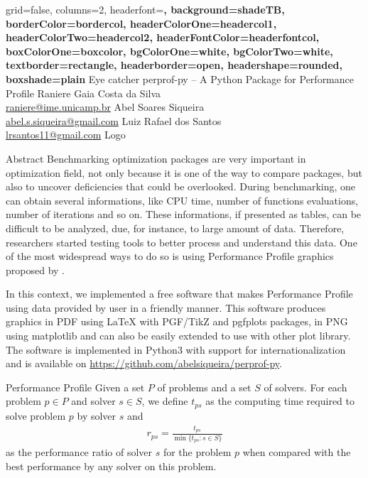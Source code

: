 \documentclass[a0paper,portrait]{baposter}
\begin{document}

\begin{poster}
  {
    grid=false,
    columns=2,
    headerfont=\Large\sf\bf,
    background=shadeTB,
    borderColor=bordercol,
    headerColorOne=headercol1,
    headerColorTwo=headercol2,
    headerFontColor=headerfontcol,
    boxColorOne=boxcolor,
    bgColorOne=white,
    bgColorTwo=white,
    textborder=rectangle,
    headerborder=open,
    headershape=rounded,
    boxshade=plain
  }
  {
    Eye catcher
  }
  {
      perprof-py -- A Python Package for Performance Profile 
  }
  {
        Raniere Gaia Costa da Silva \\
        \url{raniere@ime.unicamp.br}
        Abel Soares Siqueira \\
        \url{abel.s.siqueira@gmail.com}
        Luiz Rafael dos Santos \\
        \url{lrsantos11@gmail.com}
  }
  {
    Logo
  }


  \begin{posterbox}[column=0]{Abstract}
    Benchmarking optimization packages are very important in optimization
    field, not only because it is one of the way to compare packages, but also
    to uncover deficiencies that could be overlooked. During benchmarking, one
    can obtain several informations, like CPU time, number of functions
    evaluations, number of iterations and so on. These informations, if
    presented as tables, can be difficult to be analyzed, due, for instance,
    to large amount of data. Therefore, researchers started testing tools to
    better process and understand this data.  One of the most widespread ways
    to do so is using Performance Profile graphics proposed by
    \cite{Dolan2001}.

    In this context, we implemented a free software that makes Performance
    Profile using data provided by user in a friendly manner. This software
    produces graphics in PDF using LaTeX with PGF/TikZ\nocite{TikZ} and
    pgfplots\nocite{pgfplots} packages, in PNG using
    matplotlib\nocite{Hunter:2007} and can also be easily extended to use with
    other plot library. The software is implemented in Python3 with support
    for internationalization and is available on
    \url{https://github.com/abelsiqueira/perprof-py}.
  \end{posterbox}

  \begin{posterbox}[column=0,below=auto,height=bottom]{Performance Profile}
    Given a set $P$ of problems and a set $S$ of solvers. For each problem $p
    \in P$ and solver $s \in S$, we define $t_{ps}$ as the computing time
    required to solve problem $p$ by solver $s$ and
    \begin{align*}
      r_{ps} = \frac{t_{ps}}{\min\{t_{ps}: s \in S\}}
    \end{align*}
    as the performance ratio of solver $s$ for the problem $p$ when compared
    with the best performance by any solver on this problem.


\end{posterbox}
\end{poster}
\end{document}
